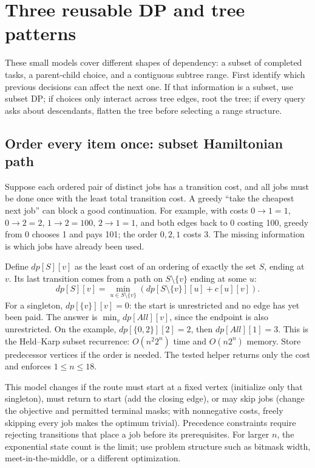 \section{Three reusable DP and tree patterns}
These small models cover different shapes of dependency: a subset of
completed tasks, a parent-child choice, and a contiguous subtree range.
First identify which previous decisions can affect the next one. If that
information is a subset, use subset DP; if choices only interact across
tree edges, root the tree; if every query asks about descendants, flatten
the tree before selecting a range structure.

\subsection{Order every item once: subset Hamiltonian path}
Suppose each ordered pair of distinct jobs has a transition cost, and all
jobs must be done once with the least total transition cost. A greedy
``take the cheapest next job'' can block a good continuation. For example,
with costs $0\to1=1$, $0\to2=2$, $1\to2=100$, $2\to1=1$,
and both edges back to 0 costing 100, greedy
from 0 chooses 1 and pays 101; the order $0,2,1$ costs 3. The missing
information is which jobs have already been used.

Define $dp[S][v]$ as the least cost of an ordering of exactly the set
$S$, ending at $v$. Its last transition comes from a path on
$S\setminus\{v\}$ ending at some $u$:
\[
 dp[S][v]=\min_{u\in S\setminus\{v\}}
       (dp[S\setminus\{v\}][u]+c[u][v]).
\]
For a singleton, $dp[\{v\}][v]=0$: the start is unrestricted and no
edge has yet been paid. The answer is $\min_v dp[All][v]$, since the
endpoint is also unrestricted. On the example, $dp[\{0,2\}][2]=2$,
then $dp[All][1]=3$. This is the Held--Karp subset recurrence: $O(n^2 2^n)$
time and $O(n2^n)$ memory. Store predecessor vertices if the order is
needed. The tested helper returns only the cost and enforces $1\le n\le18$.

This model changes if the route must start at a fixed vertex (initialize
only that singleton), must return to start (add the closing edge), or may
skip jobs (change the objective and permitted terminal masks; with nonnegative costs,
freely skipping every job makes the optimum trivial). Precedence constraints require
rejecting transitions that place a job before its prerequisites. For
larger $n$, the exponential state count is the limit; use problem structure
such as bitmask width, meet-in-the-middle, or a different optimization.

